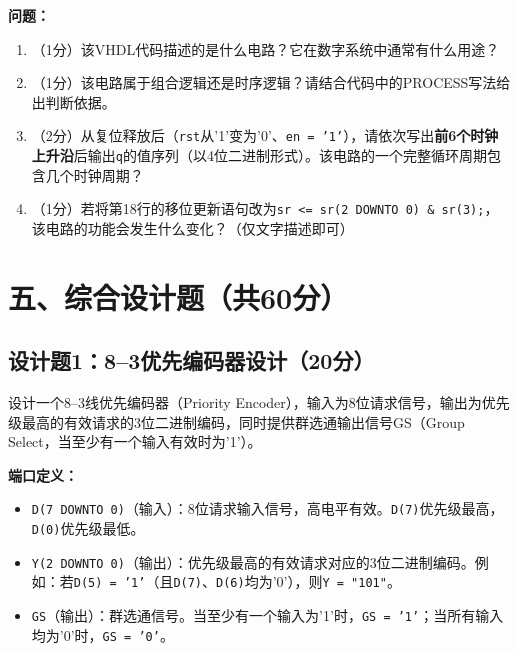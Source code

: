 \vspace{0.3cm}

\begin{framed}
\textbf{问题：}
\begin{enumerate}[label=(\arabic*)]
  \item （1分）该VHDL代码描述的是什么电路？它在数字系统中通常有什么用途？
  \item （1分）该电路属于组合逻辑还是时序逻辑？请结合代码中的PROCESS写法给出判断依据。
  \item （2分）从复位释放后（\texttt{rst}从'1'变为'0'、\texttt{en = '1'}），请依次写出\textbf{前6个时钟上升沿}后输出\texttt{q}的值序列（以4位二进制形式）。该电路的一个完整循环周期包含几个时钟周期？
  \item （1分）若将第18行的移位更新语句改为\texttt{sr <= sr(2 DOWNTO 0) \& sr(3);}，该电路的功能会发生什么变化？（仅文字描述即可）
\end{enumerate}
\end{framed}

\newpage

\section*{五、综合设计题（共60分）}

\subsection*{设计题1：8--3优先编码器设计（20分）}

设计一个8--3线优先编码器（Priority Encoder），输入为8位请求信号，输出为优先级最高的有效请求的3位二进制编码，同时提供群选通输出信号GS（Group Select，当至少有一个输入有效时为'1'）。

\vspace{0.3cm}

\textbf{端口定义：}
\begin{itemize}
  \item \texttt{D(7 DOWNTO 0)}（输入）：8位请求输入信号，高电平有效。\texttt{D(7)}优先级最高，\texttt{D(0)}优先级最低。
  \item \texttt{Y(2 DOWNTO 0)}（输出）：优先级最高的有效请求对应的3位二进制编码。例如：若\texttt{D(5) = '1'}（且\texttt{D(7)}、\texttt{D(6)}均为'0'），则\texttt{Y = "101"}。
  \item \texttt{GS}（输出）：群选通信号。当至少有一个输入为'1'时，\texttt{GS = '1'}；当所有输入均为'0'时，\texttt{GS = '0'}。
\end{itemize}

